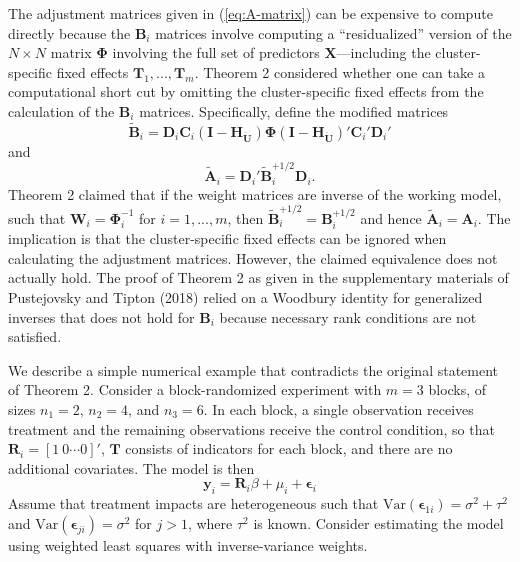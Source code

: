 \documentclass[12pt]{article}
\begin{document}
The adjustment matrices given in (\ref{eq:A-matrix}) can be expensive to
compute directly because the \(\mathbf{B}_i\) matrices involve computing
a ``residualized'' version of the \(N \times N\) matrix
\(\boldsymbol\Phi\) involving the full set of predictors
\(\mathbf{X}\)---including the cluster-specific fixed effects
\(\mathbf{T}_1,...,\mathbf{T}_m\). Theorem 2 considered whether one can
take a computational short cut by omitting the cluster-specific fixed
effects from the calculation of the \(\mathbf{B}_i\) matrices.
Specifically, define the modified matrices \begin{equation}
\label{eq:B-modified}
\mathbf{\tilde{B}}_i = \mathbf{D}_i \mathbf{C}_i \left(\mathbf{I} - \mathbf{H}_{\mathbf{\ddot{U}}}\right) \boldsymbol\Phi \left(\mathbf{I} - \mathbf{H}_{\mathbf{\ddot{U}}}\right)'\mathbf{C}_i' \mathbf{D}_i'
\end{equation} and \begin{equation}
\label{eq:A-modified}
\mathbf{\tilde{A}}_i = \mathbf{D}_i' \mathbf{\tilde{B}}_i^{+1/2} \mathbf{D}_i.
\end{equation} Theorem 2 claimed that if the weight matrices are inverse
of the working model, such that
\(\mathbf{W}_i = \boldsymbol\Phi_i^{-1}\) for \(i = 1,...,m\), then
\(\mathbf{\tilde{B}}_i^{+1/2} = \mathbf{B}_i^{+1/2}\) and hence
\(\mathbf{\tilde{A}}_i = \mathbf{A}_i\). The implication is that the
cluster-specific fixed effects can be ignored when calculating the
adjustment matrices. However, the claimed equivalence does not actually
hold. The proof of Theorem 2 as given in the supplementary materials of
Pustejovsky and Tipton (2018) relied on a Woodbury identity for
generalized inverses that does not hold for \(\mathbf{B}_i\) because
necessary rank conditions are not satisfied.

We describe a simple numerical example that contradicts the original
statement of Theorem 2. Consider a block-randomized experiment with
\(m = 3\) blocks, of sizes \(n_1 = 2\), \(n_2 = 4\), and \(n_3 = 6\). In
each block, a single observation receives treatment and the remaining
observations receive the control condition, so that
\(\mathbf{R}_i = \left[1 \ 0 \cdots 0\right]'\), \(\mathbf{T}\) consists
of indicators for each block, and there are no additional covariates.
The model is then \[
\mathbf{y}_i = \mathbf{R}_i \beta + \mu_i + \boldsymbol\epsilon_i
\] Assume that treatment impacts are heterogeneous such that
\(\text{Var}(\boldsymbol\epsilon_{1i}) = \sigma^2 + \tau^2\) and
\(\text{Var}(\boldsymbol\epsilon_{ji}) = \sigma^2\) for \(j > 1\), where
\(\tau^2\) is known. Consider estimating the model using weighted least
squares with inverse-variance weights.
\end{document}
